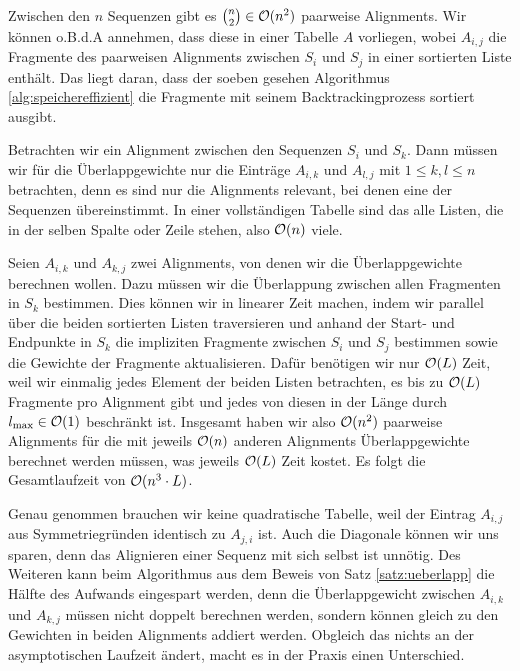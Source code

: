\setlength{\intextsep}{\oldintextsep}

\begin{beweis}
	Zwischen den $n$ Sequenzen gibt es ${{n}\choose{2}} \in \mathcal{O}(n^2)$ paarweise Alignments. Wir können o.B.d.A annehmen, dass diese in einer Tabelle $A$ vorliegen, wobei $A_{i,j}$ die Fragmente des paarweisen Alignments zwischen $S_i$ und $S_j$ in einer sortierten Liste enthält. Das liegt daran, dass der soeben gesehen Algorithmus \ref{alg:speichereffizient} die Fragmente mit seinem Backtrackingprozess sortiert ausgibt. 
	
	Betrachten wir ein Alignment zwischen den Sequenzen $S_i$ und $S_k$. Dann müssen wir für die Überlappgewichte nur die Einträge $A_{i,k}$ und $A_{l,j}$ mit $1 \leq k,l \leq n$ betrachten, denn es sind nur die Alignments relevant, bei denen eine der Sequenzen übereinstimmt. In einer vollständigen Tabelle sind das alle Listen, die in der selben Spalte oder Zeile stehen, also $\mathcal{O}(n)$ viele.
	
	Seien $A_{i,k}$ und $A_{k,j}$ zwei Alignments, von denen wir die Überlappgewichte berechnen wollen. Dazu müssen wir die Überlappung zwischen allen Fragmenten in $S_k$ bestimmen. Dies können wir in linearer Zeit machen, indem wir parallel über die beiden sortierten Listen traversieren und anhand der Start- und Endpunkte in $S_k$ die impliziten Fragmente zwischen $S_i$ und $S_j$ bestimmen sowie die Gewichte der Fragmente aktualisieren. Dafür benötigen wir nur $\mathcal{O}(L)$ Zeit, weil wir einmalig jedes Element der beiden Listen betrachten, es bis zu $\mathcal{O}(L)$ Fragmente pro Alignment gibt und jedes von diesen in der Länge durch $l_{\max} \in \mathcal{O}(1)$ beschränkt ist.
	Insgesamt haben wir also $\mathcal{O}(n^2)$ paarweise Alignments für die mit jeweils $\mathcal{O}(n)$ anderen Alignments Überlappgewichte berechnet werden müssen, was jeweils $\mathcal{O}(L)$ Zeit kostet. Es folgt die Gesamtlaufzeit von $\mathcal{O}(n^3\cdot L)$.
\end{beweis}

Genau genommen brauchen wir keine quadratische Tabelle, weil der Eintrag $A_{i,j}$ aus Symmetriegründen identisch zu $A_{j,i}$ ist. Auch die Diagonale können wir uns sparen, denn das Alignieren einer Sequenz mit sich selbst ist unnötig. Des Weiteren kann beim Algorithmus aus dem Beweis von Satz \ref{satz:ueberlapp} die Hälfte des Aufwands eingespart werden, denn die Überlappgewicht zwischen $A_{i,k}$ und $A_{k,j}$ müssen nicht doppelt berechnen werden, sondern können gleich zu den Gewichten in beiden Alignments addiert werden. Obgleich das nichts an der asymptotischen Laufzeit ändert, macht es in der Praxis einen Unterschied. 

